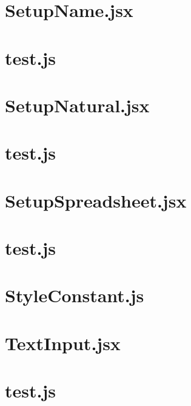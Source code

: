 \documentclass[a4paper,landscape]{report}
\begin{document}
\newpage
\section{SetupName.jsx}


\newpage
\section{test.js}


\newpage
\section{SetupNatural.jsx}


\newpage
\section{test.js}


\newpage
\section{SetupSpreadsheet.jsx}


\newpage
\section{test.js}


\newpage
\section{StyleConstant.js}


\newpage
\section{TextInput.jsx}


\newpage
\section{test.js}

\end{document}
